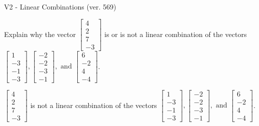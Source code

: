 \begin{exercise}
  \begin{exerciseTitle}V2 - Linear Combinations (ver. 569)\end{exerciseTitle}
  \begin{exerciseStatement}
    Explain why the vector \(\left[\begin{array}{c}
4 \\
2 \\
7 \\
-3
\end{array}\right]\)  is or is not a linear 
	combination of the vectors \(\left[\begin{array}{c}
1 \\
-3 \\
-1 \\
-3
\end{array}\right] , \left[\begin{array}{c}
-2 \\
-2 \\
-3 \\
-1
\end{array}\right] , \text{ and } \left[\begin{array}{c}
6 \\
-2 \\
4 \\
-4
\end{array}\right]\).
	


  \end{exerciseStatement}
  \begin{exerciseAnswer}
   \(\left[\begin{array}{c}
4 \\
2 \\
7 \\
-3
\end{array}\right]\) 
  	 is not  
	a linear combination of the vectors \(\left[\begin{array}{c}
1 \\
-3 \\
-1 \\
-3
\end{array}\right] , \left[\begin{array}{c}
-2 \\
-2 \\
-3 \\
-1
\end{array}\right] , \text{ and } \left[\begin{array}{c}
6 \\
-2 \\
4 \\
-4
\end{array}\right]\).

	
  


  \end{exerciseAnswer}
\end{exercise}